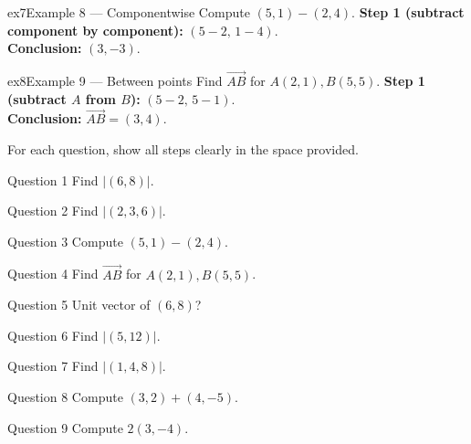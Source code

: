 \documentclass[11pt]{article}
\begin{document}
\begin{example}{ex7}{Example 8 --- Componentwise}
Compute $(5,1)-(2,4)$.\soln
\textbf{Step 1 (subtract component by component):} $(5-2,\,1-4)$.\\[3pt]
\textbf{Conclusion:} $(3,-3)$.
\end{example}

\begin{example}{ex8}{Example 9 --- Between points}
Find $\vec{AB}$ for $A(2,1),B(5,5)$.\soln
\textbf{Step 1 (subtract $A$ from $B$):} $(5-2,\,5-1)$.\\[3pt]
\textbf{Conclusion:} $\vec{AB}=(3,4)$.
\end{example}

\clearpage
{}
For each question, show all steps clearly in the space provided.

\begin{qbox}{Question 1}
Find $|(6,8)|$.\workspace{2.4cm}
\end{qbox}

\begin{qbox}{Question 2}
Find $|(2,3,6)|$.\workspace{2.4cm}
\end{qbox}

\begin{qbox}{Question 3}
Compute $(5,1)-(2,4)$.\workspace{2.4cm}
\end{qbox}

\begin{qbox}{Question 4}
Find $\vec{AB}$ for $A(2,1),B(5,5)$.\workspace{2.4cm}
\end{qbox}

\begin{qbox}{Question 5}
Unit vector of $(6,8)$?\workspace{2.4cm}
\end{qbox}

\begin{qbox}{Question 6}
Find $|(5,12)|$.\workspace{2.4cm}
\end{qbox}

\begin{qbox}{Question 7}
Find $|(1,4,8)|$.\workspace{2.4cm}
\end{qbox}

\begin{qbox}{Question 8}
Compute $(3,2)+(4,-5)$.\workspace{2.4cm}
\end{qbox}

\begin{qbox}{Question 9}
Compute $2(3,-4)$.\workspace{2.4cm}
\end{qbox}
\end{document}
